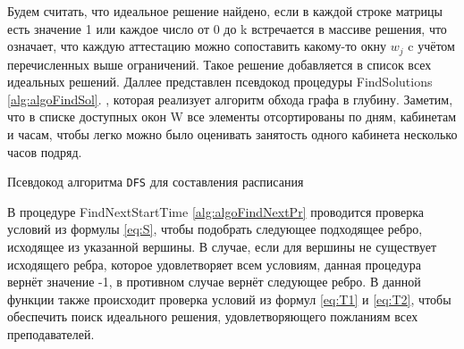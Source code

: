 Будем считать, что идеальное решение найдено, если в каждой строке матрицы есть значение 1 или каждое число от 0 до k встречается в массиве решения, что означает, что каждую аттестацию можно сопоставить какому-то окну ${w_j}$ c учётом перечисленных выше ограничений. Такое решение добавляется в список всех идеальных решений. Даллее представлен псевдокод процедуры FindSolutions \ref{alg:algoFindSol}. , которая реализует алгоритм обхода графа в глубину. Заметим, что в списке доступных окон W все элементы отсортированы по дням, кабинетам и часам, чтобы легко можно было оценивать занятость одного кабинета несколько часов подряд.

	\begin{algorithm} 
	\nonl{}
	\caption{Псевдокод алгоритма \texttt{DFS} для составления расписания}\label{alg:algoFindSol}
\end{algorithm} 

В процедуре FindNextStartTime \ref{alg:algoFindNextPr} проводится проверка условий из формулы \eqref{eq:S}, чтобы подобрать следующее подходящее ребро, исходящее из указанной вершины. В случае, если для вершины не существует исходящего ребра, которое удовлетворяет всем условиям, данная процедура вернёт значение -1, в противном случае вернёт следующее ребро. В данной функции также происходит проверка условий из формул \eqref{eq:T1} и \eqref{eq:T2}, чтобы обеспечить поиск идеального решения, удовлетворяющего пожланиям всех преподавателей. 

